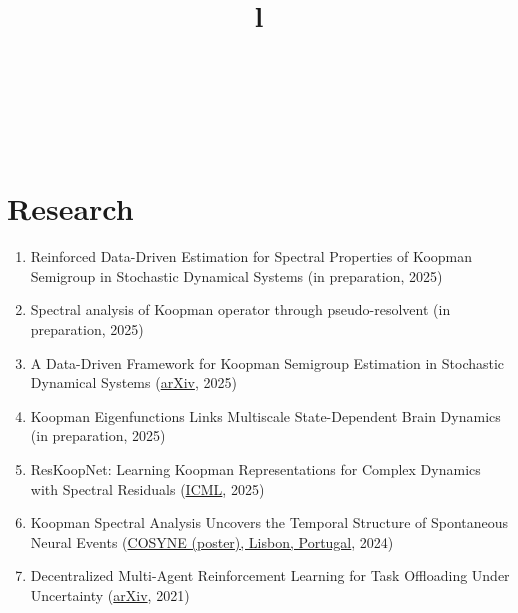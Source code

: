 \documentclass[margin]{res}
\begin{document}
\begin{resume}
\begin{format}
\title{l}\\
\\
\body\\
\end{format}


\section{Research}

\begin{enumerate}
    \item Reinforced Data-Driven Estimation for Spectral Properties of Koopman Semigroup in Stochastic Dynamical Systems (in preparation, 2025)
    
    \item Spectral analysis of Koopman operator through pseudo-resolvent (in preparation, 2025)
    
    \item A Data-Driven Framework for Koopman Semigroup Estimation in Stochastic Dynamical Systems (\href{https://arxiv.org/abs/2501.13301}{arXiv}, 2025) 

    \item Koopman Eigenfunctions Links Multiscale State-Dependent Brain Dynamics (in preparation, 2025)

    \item ResKoopNet: Learning Koopman Representations for Complex Dynamics with Spectral Residuals (\href{https://arxiv.org/abs/2501.00701}{ICML}, 2025)

    \item  Koopman Spectral Analysis Uncovers the Temporal Structure of Spontaneous Neural Events (\href{https://static1.squarespace.com/static/6102ca347474c263c40150cd/t/65e1abbdf843e41837fc9c0d/1709288389623/Cosyne2024_program_book.pdf}{COSYNE (poster), Lisbon, Portugal}, 2024)

    \item Decentralized Multi-Agent Reinforcement Learning for Task Offloading Under Uncertainty (\href{https://arxiv.org/abs/2107.08114}{arXiv}, 2021)



\end{enumerate}
\end{resume}
\end{document}
